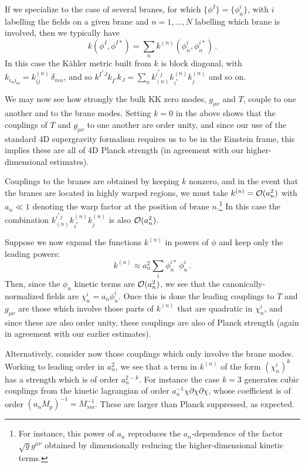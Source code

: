 \documentclass[12pt]{JHEP3}
\begin{document}
If we specialize to the case of several branes, for which
$\{\phi^I \} = \{\phi^i_n \}$, with $i$ labelling the fields on a
given brane and $n = 1,\dots,N$ labelling which brane is involved,
then we typically have
%
\begin{equation}
    k(\phi^I,\phi^{I*}) = \sum_n k^{(n)}(\phi^i_n, \phi^{i*}_n)
    \,.
\end{equation}
%
In this case the K\"ahler metric built from $k$ is block diagonal,
with $k_{i_n j_m} = k^{(n)}_{ij} \, \delta_{mn}$, and so $k^{I^*J}
k_{I^*} k_J = \sum_n k_{(n)}^{i^* j} k^{(n)}_{i^*} k^{(n)}_{j}$
and so on.

We may now see how strongly the bulk KK zero modes, $g_{\mu\nu}$
and $T$, couple to one another and to the brane modes. Setting $k
= 0$ in the above shows that the couplings of $T$ and $g_{\mu\nu}$
to one another are order unity, and since our use of the standard
4D supergravity formalism requires us to be in the Einstein frame,
this implies these are all of 4D Planck strength (in agreement
with our higher-dimensional estimates).

Couplings to the branes are obtained by keeping $k$ nonzero, and
in the event that the branes are located in highly warped regions,
we must take $k^{(n)} = {\cal O}(a_n^2)$ with $a_n \ll 1$ denoting
the warp factor at the position of brane $n$.\footnote{For
instance, this power of $a_n$ reproduces the $a_n$-dependence of
the factor $\sqrt{g} g^{\mu\nu}$ obtained by dimensionally
reducing the higher-dimensional kinetic terms.} In this case the
combination $k_{(n)}^{i^* j} k^{(n)}_{i^*} k^{(n)}_{j}$ is also
${\cal O}(a_n^2)$.

Suppose we now expand the functions $k^{(n)}$ in powers of $\phi$
and keep only the leading powers:
%
\begin{equation}
    k^{(n)} \approx a_n^2 \sum_i \phi^{i*}_n \, \phi^i_n \,.
\end{equation}
%
Then, since the $\phi_n$ kinetic terms are ${\cal O}(a_n^2)$, we
see that the canonically-normalized fields are $\chi^i_n = a_n
\phi^i_n$. Once this is done the leading couplings to $T$ and
$g_{\mu\nu}$ are those which involve those parts of $k^{(n)}$ that
are quadratic in $\chi^i_n$, and since these are also order unity,
these couplings are also of Planck strength (again in agreement
with our earlier estimates).

Alternatively, consider now those couplings which only involve the
brane modes. Working to leading order in $a_n^2$, we see that a
term in $k^{(n)}$ of the form $(\chi^i_n)^k$ has a strength which
is of order $a_n^{2-k}$. For instance the case $k = 3$ generates
cubic couplings from the kinetic lagrangian of order $a_n^{-1}
\chi \partial \chi \partial \chi$, whose coefficient is of order
$(a_n M_p)^{-1} = M_{sm}^{-1}$. These are larger than Planck
suppressed, as expected.
\end{document}
